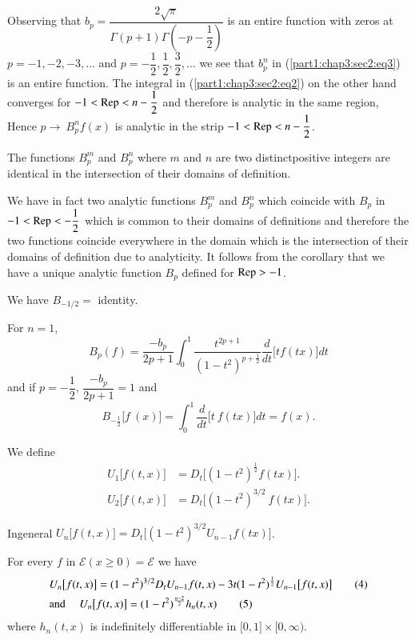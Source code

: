 Observing that $b_p = \dfrac{2 \sqrt{\pi}}{\Gamma (p+1) \Gamma
  (-p-\dfrac{1}{2})}$ is an entire function with zeros at $ p = -1,
-2, -3, \ldots$ and $p = -\dfrac{1}{2}, \dfrac{1}{2}, \dfrac{3}{2},
\ldots $ we see that $b^n_p$ in (\ref{part1:chap3:sec2:eq3}) is an entire function. The
integral in (\ref{part1:chap3:sec2:eq2}) on the other hand converges for $-1 < \operatorname{Rep} < n -
\dfrac{1}{2}$ and therefore is  analytic in the same region, Hence $p
\to ~ B^n_p f (x)$ is analytic  in the strip $-1 < \operatorname{Rep} < n-
\dfrac{1}{2}$. 

\begin{coro*}
  The functions $B^m_p$ and $B^n_p$ where $m$ and $n$ are two
  distinct\pageoriginale positive integers are identical in the intersection of
  their domains of definition. 
\end{coro*}

We have in fact two analytic functions $B^m_p$ and $B^n_p$ which
coincide with $B_p$ in $-1 < \operatorname{Rep} < -\dfrac{1}{2}$ which is common to
their domains of definitions and therefore the two functions coincide
everywhere in the domain  which is the  intersection of  their domains
of definition due to analyticity. It follows from  the corollary that
we have  a unique analytic function $B_p$ defined for $\operatorname{Rep} > -1$.  

\begin{remark*}
  We have $B_{-1/2}=$ identity.
\end{remark*}

For $n=1$,
$$
B_p (f) = \frac{-b_p}{2p+1} \int^1_0 
\frac{t^{2p+1}}{(1-t^2)^{p+\frac{1}{2}}} \frac{d}{dt} \big[ tf (tx)
\big]dt 
$$
and if $p = -\dfrac{1}{2}$, $\dfrac{-b_p}{2p+1} = 1 $ and 
$$
B_{-\frac{1}{2}} \big[ f ~ (x) \big] = \int^1_0 \frac{d}{dt} \big[ t ~
  f(tx) \big] dt = f (x).  
$$


We define
\begin{align*}
  U_1 \big[ f (t, x) \big]  &= D_t \big[ (1-t^2)^{\frac{1}{2}} f (tx) \big]. \\
  U_2 \big[ f (t, x) \big] &= D_t \big[ (1-t^2)^{3/2} ~ f(tx) \big]. 
\end{align*}

In\pageoriginale general \hspace{.5cm} $ U_n \big[ f(t, x) \big] = D_t \big[
  (1-t^2)^{3/2} U_{n-1} f(tx) \big]$. 

\begin{lem}\label{part1:chap3:sec2:lem3}%
  For every $f$ in $\mathcal{E} (x \geq 0 ) = \mathscr{E}$ we have 
\noindent 
\begin{align*}
    & U_n \big[ f (t, x) \big]  = (1-t^2)^{3/2} D_t U_{n-1} f (t, x) -3t
    (1-t^2)^{\frac{1}{2}} U_{n-1} \big[ f (t, x) \big]
    \tag{4}\label{part1:chap3:sec2:eq4} \\
    &\text{\rm and }\quad  
    U_n \big[ f (t, x) \big]  = (1-t^2)^{\frac{n-2}{2}} h_n (t, x)
    \tag{5} \label{part1:chap3:sec2:eq5}
\end{align*}
  where $ h_n (t, x)$ is indefinitely differentiable in $\big[ 0, 1
    \big] \times \big[ 0, \infty \big)$. 
\end{lem}

